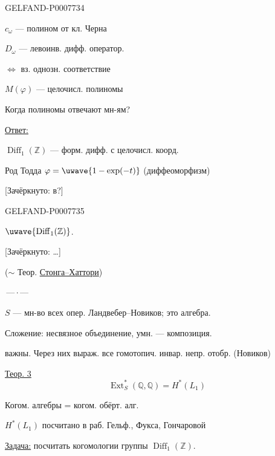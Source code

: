 \begin{GelfandAdjacentEvidence}{GELFAND-P000773}{4}


\(c_\omega\) --- полином от кл. Черна

\(D_\omega\) --- левоинв. дифф. оператор.

\(\Longleftrightarrow\) вз. однозн. соответствие

\(M(\varphi)\) --- целочисл. полиномы

Когда полиномы отвечают мн-ям?

\underline{Ответ:}


\(\operatorname{Diff}_1(\mathbb Z)\) --- форм. дифф. с целочисл. коорд.

Род Тодда \(\varphi=\uwave{1-\exp(-t)}\) (диффеоморфизм)


[Зачёркнуто: в?]
\end{GelfandAdjacentEvidence}
\begin{GelfandAdjacentEvidence}{GELFAND-P000773}{5}

\(\uwave{\operatorname{Diff}_1(\mathbb Z)}\).

[Зачёркнуто: …]
\end{GelfandAdjacentEvidence}

(\(\sim\) Теор. \underline{Стонга--Хаттори})

\begin{center}\(\text{---}\,\cdot\,\text{---}\)\end{center}

\(S\) --- мн-во всех опер. Ландвебер--Новиков; это алгебра.

Сложение: несвязное объединение, умн. --- композиция.

 важны. Через них выраж. все гомотопич. инвар. непр. отобр. (Новиков)

\underline{Теор. 3}
\[
\operatorname{Ext}_S^*(\mathbb Q,\mathbb Q)=H^*(L_1)
\]

Когом. алгебры = когом. обёрт. алг.

\(H^*(L_1)\) посчитано в раб. Гельф., Фукса, Гончаровой

\underline{Задача:} посчитать когомологии группы \(\operatorname{Diff}_1(\mathbb Z)\).


